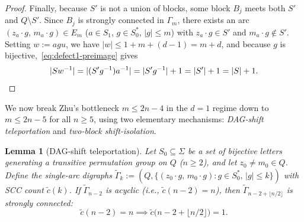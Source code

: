 \documentclass[11pt,a4paper]{article}
\newtheorem{lemma}[theorem]{Lemma}
\theoremstyle{definition}
\theoremstyle{remark}
\begin{document}
\begin{proof}
Finally, because $S'$ is not a union of blocks, some block $B_j$ meets both $S'$ and $Q \setminus S'$. Since $B_j$ is strongly connected in $\Gamma_m$, there exists an arc $(z_a \cdot g,\, m_a \cdot g) \in E_m$ ($a \in S_1$, $g \in S_0^*$, $|g| \le m$) with $z_a \cdot g \in S'$ and $m_a \cdot g \notin S'$. Setting $w := a g u$, we have $|w| \le 1 + m + (d - 1) = m + d$, and because $g$ is bijective,~\eqref{eq:defect1-preimage} gives
\[
  |S w^{-1}| = |(S' g^{-1}) a^{-1}| = |S' g^{-1}| + 1 = |S'| + 1 = |S| + 1. \qedhere
\]
\end{proof}

We now break Zhu's bottleneck $m \le 2n - 4$ in the $d = 1$ regime down to $m \le 2n - 5$ for all $n \ge 5$, using two elementary mechanisms: \emph{DAG-shift teleportation} and \emph{two-block shift-isolation}.

\begin{lemma}[DAG-shift teleportation]\label{lem:dag-teleport}
Let $S_0 \subseteq \Sigma$ be a set of bijective letters generating a transitive permutation group on $Q$ ($n \ge 2$), and let $z_0 \neq m_0 \in Q$. Define the single-arc digraphs $\widetilde{\Gamma}_k := (Q, \{(z_0 \cdot g,\, m_0 \cdot g) : g \in S_0^*,\, |g| \le k\})$ with SCC count $\widetilde{c}(k)$. If $\widetilde{\Gamma}_{n - 2}$ is acyclic (i.e., $\widetilde{c}(n - 2) = n$), then $\widetilde{\Gamma}_{n - 2 + \lfloor n / 2 \rfloor}$ is strongly connected:
\[
  \widetilde{c}(n - 2) = n \implies \widetilde{c}\bigl(n - 2 + \lfloor n / 2 \rfloor\bigr) = 1.
\]
\end{lemma}
\end{document}
